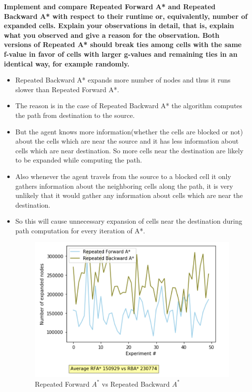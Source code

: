 \documentclass[a4 paper]{article}
\begin{document}

\textbf{\hspace{-15pt}Implement and compare Repeated Forward A* and Repeated Backward A*
with respect to their runtime or, equivalently, number of expanded cells. Explain your observations in detail, that is, explain
what you observed and give a reason for the observation. Both versions of Repeated A* should break ties among cells with
the same f-value in favor of cells with larger g-values and remaining ties in an identical way, for example randomly.}

\begin{itemize}
    \item Repeated Backward A* expands more number of nodes and thus it runs slower than Repeated Forward A*.
    \item The reason is in the case of Repeated Backward A* the algorithm computes the path from destination to the source.
    \item But the agent knows more information(whether the cells are blocked or not) about the cells which are near the source and it has less information about cells which are near destination. So more cells near the destination are likely to be expanded while computing the path. 
    \item Also whenever the agent travels from the source to a blocked cell it only gathers information about the neighboring cells along the path, it is very unlikely that it would gather any information about cells which are near the destination. \item So this will cause unnecessary expansion of cells near the destination during path computation for every iteration of A*.
    
    \begin{figure}[H]
        \centering
        \includegraphics[scale=0.5]{rfa vs rba.png}
        \caption{Repeated Forward $A^*$ vs Repeated Backward $A^*$}
        \label{Repeated Forward A^* vs Repeated Backward A^*}
    \end{figure}
    
\end{itemize}
\end{document}
